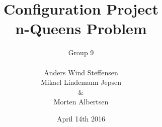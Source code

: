 \pagestyle{empty}


\title{Configuration Project \\\large n-Queens Problem}
\author{Group 9 \\\\Anders Wind Steffensen\\Mikael Lindemann Jepsen\\\&\\Morten Albertsen}
\date{\vspace{\baselineskip}April 14th 2016}



\maketitle
\clearpage



